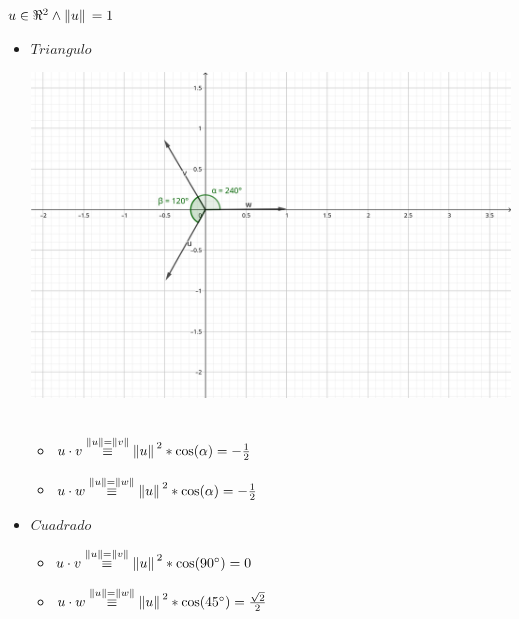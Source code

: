 \documentclass[../practica_01.tex]{subfiles}
\begin{document}
    $u \in \real^2 \wedge \norm*{u}=1$

    \begin{itemize}

        \item $Triangulo$

            \includegraphics[scale=0.2]{ej05/resources/5a.png} $ $

            \begin{itemize}

                \item $u \cdot v \stackrel{\norm*{u} = \norm*{v}}{\equiv} \norm*{u}^2 * \cos(\alpha) = -\frac{1}{2}$

                \item $u \cdot w \stackrel{\norm*{u} = \norm*{w}}{\equiv} \norm*{u}^2 * \cos(\alpha) = -\frac{1}{2}$

            \end{itemize}

        \item $Cuadrado$

            \begin{itemize}

                \item $u \cdot v \stackrel{\norm*{u} = \norm*{v}}{\equiv} \norm*{u}^2 * \cos(90^\circ) = 0$

                \item $u \cdot w \stackrel{\norm*{u} = \norm*{w}}{\equiv} \norm*{u}^2 * \cos(45^\circ) = \frac{\sqrt{2}}{2}$

            \end{itemize}

    \end{itemize}
\end{document}
